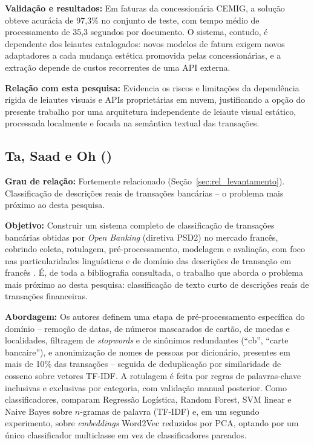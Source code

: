 \textbf{Validação e resultados:} Em faturas da concessionária CEMIG, a solução obteve acurácia de 97,3\% no conjunto de teste, com tempo médio de processamento de 35,3 segundos por documento. O sistema, contudo, é dependente dos leiautes catalogados: novos modelos de fatura exigem novos adaptadores a cada mudança estética promovida pelas concessionárias, e a extração depende de custos recorrentes de uma API externa.

\textbf{Relação com esta pesquisa:} Evidencia os riscos e limitações da dependência rígida de leiautes visuais e APIs proprietárias em nuvem, justificando a opção do presente trabalho por uma arquitetura independente de leiaute visual estático, processada localmente e focada na semântica textual das transações.

\subsection{Ta, Saad e Oh (\citeyear{ta2023specialized})}
\textbf{Grau de relação:} Fortemente relacionado (Seção~\ref{sec:rel_levantamento}). Classificação de descrições reais de transações bancárias -- o problema mais próximo ao desta pesquisa.

\textbf{Objetivo:} Construir um sistema completo de classificação de transações bancárias obtidas por \textit{Open Banking} (diretiva PSD2) no mercado francês, cobrindo coleta, rotulagem, pré-processamento, modelagem e avaliação, com foco nas particularidades linguísticas e de domínio das descrições de transação em francês \cite{ta2023specialized}. É, de toda a bibliografia consultada, o trabalho que aborda o problema mais próximo ao desta pesquisa: classificação de texto curto de descrições reais de transações financeiras.

\textbf{Abordagem:} Os autores definem uma etapa de pré-processamento específica do domínio -- remoção de datas, de números mascarados de cartão, de moedas e localidades, filtragem de \textit{stopwords} e de sinônimos redundantes (``cb'', ``carte bancaire''), e anonimização de nomes de pessoas por dicionário, presentes em mais de 10\% das transações -- seguida de deduplicação por similaridade de cosseno sobre vetores TF-IDF. A rotulagem é feita por regras de palavras-chave inclusivas e exclusivas por categoria, com validação manual posterior. Como classificadores, comparam Regressão Logística, Random Forest, SVM linear e Naive Bayes sobre $n$-gramas de palavra (TF-IDF) e, em um segundo experimento, sobre \textit{embeddings} Word2Vec reduzidos por PCA, optando por um único classificador multiclasse em vez de classificadores pareados.

